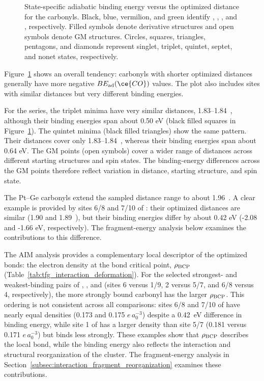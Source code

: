\begin{figure}[H]
	\begin{center}

	\end{center}
\caption{State-specific adiabatic  binding energy versus the optimized
 distance for the carbonyls. Black, blue, vermilion, and green identify , , , and , respectively. Filled symbols denote derivative structures and open symbols denote GM structures. Circles, squares, triangles, pentagons, and diamonds represent singlet, triplet, quintet, septet, and nonet states, respectively.}
\label{fig:neutral_be_vs_ptc}
\end{figure}

Figure~\ref{fig:neutral_be_vs_ptc} shows an overall tendency: carbonyls
with shorter optimized  distances generally have more negative
$BE_{\rm ad}(\ce{CO})$ values. The plot also includes sites with similar
 distances but very different binding energies.

For the  series, the triplet minima have very similar  distances, 1.83--1.84~\si{\angstromunit}, although their binding energies span about 0.50 eV (black filled squares in Figure~\ref{fig:neutral_be_vs_ptc}). The
quintet minima (black filled triangles) show the same pattern. Their distances cover only 1.83--1.84~\si{\angstromunit}, whereas their binding energies span about 0.64 eV. The GM points (open symbols) cover a wider range of  distances across different starting structures and spin states. The binding-energy differences across the GM points therefore reflect variation in  distance, starting structure, and spin state.

{The Pt--Ge carbonyls extend the sampled  distance range to
about 1.96~\si{\angstromunit}. A clear example is provided by sites 6/8 and
7/10 of : their optimized  distances are similar
(1.90 and 1.89~\si{\angstromunit}), but their binding energies differ by
about 0.42 eV (-2.08 and -1.66 eV, respectively). The fragment-energy
analysis below examines the contributions to this difference.}

The AIM analysis provides a complementary local descriptor of the
optimized  bonds: the electron density at the bond critical point,
$\rho_{\rm BCP}$ (Table~\ref{tab:tfg_interaction_deformation}). For the
selected strongest- and weakest-binding pairs of , , and
 (sites 6 versus 1/9, 2 versus 5/7, and 6/8 versus 4,
respectively), the more strongly bound carbonyl has the larger
$\rho_{\rm BCP}$. This ordering is not consistent across all comparisons:
sites 6/8 and 7/10 of  have nearly equal densities (0.173 and
0.175 $e\,a_0^{-3}$) despite a 0.42~eV difference in binding energy, while
site 1 of  has a larger density than site 5/7 (0.181 versus
0.171 $e\,a_0^{-3}$) but binds  less strongly. These examples show
that $\rho_{\rm BCP}$ describes the local  bond, while the binding
energy also reflects the interaction and structural reorganization of the
cluster. The fragment-energy analysis in Section~\ref{subsec:interaction_fragment_reorganization}
examines these contributions.

